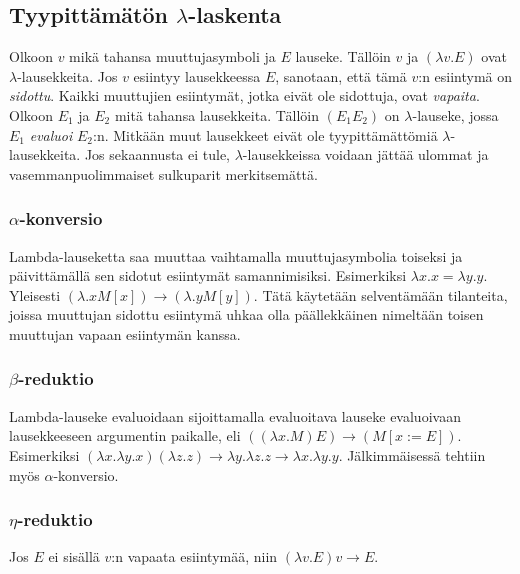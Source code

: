 \documentclass[a4paper,12pt]{amsart}
\begin{document}
\subsection{Tyypittämätön $\lambda$-laskenta}
Olkoon $v$ mikä tahansa muuttujasymboli ja $E$ lauseke. Tällöin $v$ ja $(\lambda v.E)$ ovat $\lambda$-lausekkeita. Jos $v$ esiintyy lausekkeessa $E$, sanotaan, että tämä $v$:n esiintymä on \emph{sidottu}. Kaikki muuttujien esiintymät, jotka eivät ole sidottuja, ovat \emph{vapaita}. Olkoon $E_1$ ja $E_2$ mitä tahansa lausekkeita. Tällöin $(E_1 E_2)$ on $\lambda$-lauseke, jossa $E_1$ \emph{evaluoi} $E_2$:n. Mitkään muut lausekkeet eivät ole tyypittämättömiä $\lambda$-lausekkeita. \cite{lambdalaskenta} Jos sekaannusta ei tule, $\lambda$-lausekkeissa voidaan jättää ulommat ja vasemmanpuolimmaiset sulkuparit merkitsemättä.
\subsubsection{$\alpha$-konversio}
Lambda-lauseketta saa muuttaa vaihtamalla muuttujasymbolia toiseksi ja päivittämällä sen sidotut esiintymät samannimisiksi. Esimerkiksi $\lambda x.x=\lambda y.y$. Yleisesti $(\lambda.x M[x])\to(\lambda.y M[y])$. Tätä käytetään selventämään tilanteita, joissa muuttujan sidottu esiintymä uhkaa olla päällekkäinen nimeltään toisen muuttujan vapaan esiintymän kanssa.
\subsubsection{$\beta$-reduktio}
Lambda-lauseke evaluoidaan sijoittamalla evaluoitava lauseke evaluoivaan lausekkeeseen argumentin paikalle, eli $((\lambda x.M)E)\to(M[x:=E])$. Esimerkiksi $(\lambda x.\lambda y.x)(\lambda z.z)\to\lambda y.\lambda z.z\to\lambda x.\lambda y.y$. Jälkimmäisessä tehtiin myös $\alpha$-konversio.
\subsubsection{$\eta$-reduktio}
Jos $E$ ei sisällä $v$:n vapaata esiintymää, niin $(\lambda v.E)v\to E$.
\end{document}
